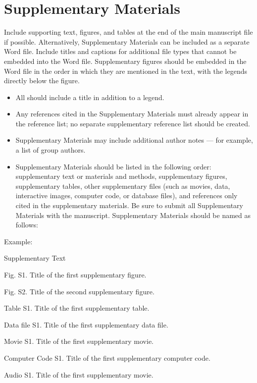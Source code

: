 \documentclass{article}
\begin{document}
\section*{Supplementary Materials}
Include supporting text, figures, and tables at the end of the main manuscript file if possible. Alternatively, Supplementary Materials can be included as a separate Word file. Include titles and captions for additional file types that cannot be embedded into the Word file. Supplementary figures should be embedded in the Word file in the order in which they are mentioned in the text, with the legends directly below the figure.
\begin{itemize}
    \item All should include a title in addition to a legend.
    \item Any references cited in the Supplementary Materials must already appear in the reference list; no separate supplementary reference list should be created.
    \item Supplementary Materials may include additional author notes — for example, a list of group authors.
    \item Supplementary Materials should be listed in the following order: supplementary text or materials and methods, supplementary figures, supplementary tables, other supplementary files (such as movies, data, interactive images, computer code, or database files), and references only cited in the supplementary materials. Be sure to submit all Supplementary Materials with the manuscript. Supplementary Materials should be named as follows:
    \end{itemize}
\medskip Example:

Supplementary Text

Fig. S1. Title of the first supplementary figure.

Fig. S2. Title of the second supplementary figure.

Table S1. Title of the first supplementary table.

Data file S1. Title of the first supplementary data file.

Movie S1. Title of the first supplementary movie.

Computer Code S1. Title of the first supplementary computer code.

Audio S1. Title of the first supplementary movie.
\end{document}
